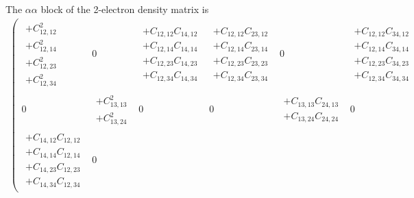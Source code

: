 \documentclass[pra,nofootinbib]{revtex4-1}
\newcommand{\C}[2]{C_{{#1},{#2}}}
\begin{document}
The $\alpha\alpha$ block of the 2-electron density matrix is
\begin{eqnarray}
   \left(\begin{array}{cccccc}
     \begin{array}{c}
     + \C{12}{12}^2 \\
     + \C{12}{14}^2 \\
     + \C{12}{23}^2 \\
     + \C{12}{34}^2
     \end{array} &
     0 &
     \begin{array}{c}
     + \C{12}{12}\C{14}{12} \\
     + \C{12}{14}\C{14}{14} \\
     + \C{12}{23}\C{14}{23} \\
     + \C{12}{34}\C{14}{34} 
     \end{array} &
     \begin{array}{c}
     + \C{12}{12}\C{23}{12} \\
     + \C{12}{14}\C{23}{14} \\
     + \C{12}{23}\C{23}{23} \\
     + \C{12}{34}\C{23}{34}
     \end{array} &
     0 &
     \begin{array}{c}
     + \C{12}{12}\C{34}{12} \\
     + \C{12}{14}\C{34}{14} \\
     + \C{12}{23}\C{34}{23} \\
     + \C{12}{34}\C{34}{34} 
     \end{array} \\
     0 &
     \begin{array}{c}
     + \C{13}{13}^2 \\
     + \C{13}{24}^2
     \end{array} &
     0 &
     0 &
     \begin{array}{c}
     + \C{13}{13}\C{24}{13} \\
     + \C{13}{24}\C{24}{24}
     \end{array} &
     0 \\
     \begin{array}{c}
     + \C{14}{12}\C{12}{12} \\
     + \C{14}{14}\C{12}{14} \\
     + \C{14}{23}\C{12}{23} \\
     + \C{14}{34}\C{12}{34} 
     \end{array} &
     0 &
     \begin{array}{c}

\end{array}
\end{array}
\end{eqnarray}
\end{document}
